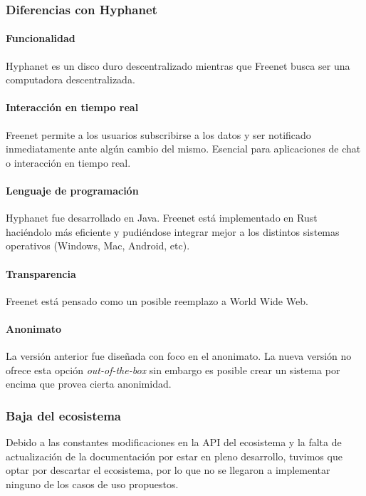 \subsubsection{Diferencias con Hyphanet}

\paragraph{Funcionalidad} Hyphanet es un disco duro descentralizado mientras que Freenet busca ser una computadora descentralizada.

\paragraph{Interacción en tiempo real} Freenet permite a los usuarios subscribirse a los datos y ser notificado inmediatamente ante algún cambio del mismo. Esencial para aplicaciones de chat o interacción en tiempo real.

\paragraph{Lenguaje de programación} Hyphanet fue desarrollado en Java. Freenet está implementado en Rust haciéndolo más eficiente y pudiéndose integrar mejor a los distintos sistemas operativos (Windows, Mac, Android, etc).

\paragraph{Transparencia} Freenet está pensado como un posible reemplazo a World Wide Web.

\paragraph{Anonimato} La versión anterior fue diseñada con foco en el anonimato. La nueva versión no ofrece esta opción \textit{out-of-the-box} sin embargo es posible crear un sistema por encima que provea cierta anonimidad.

\subsubsection{Baja del ecosistema}

Debido a las constantes modificaciones en la API del ecosistema y la falta de actualización de la documentación por estar en pleno desarrollo, tuvimos que optar por descartar el ecosistema, por lo que no se llegaron a implementar ninguno de los casos de uso propuestos.
